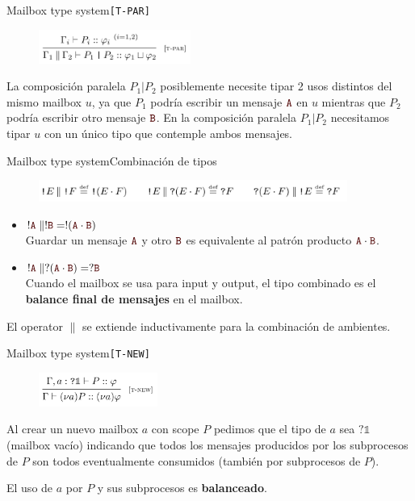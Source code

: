 \documentclass{beamer}
\newcommand{\msgtag}[1]{\texttt{\textcolor{msg-color}{#1}}}
\begin{document}
\begin{frame}{Mailbox type system}{\texttt{[T-PAR]}}
    \begin{figure}[H]
        \includegraphics[height=3em]{typing-rules-t-par}
    \end{figure}

    La composición paralela $P_1 | P_2$ posiblemente necesite tipar 2 usos distintos del mismo mailbox $u$, ya que $P_1$ podría escribir un mensaje $\msgtag{A}$ en $u$ mientras que $P_2$ podría escribir otro mensaje $\msgtag{B}$. En la composición paralela $P_1 | P_2$ necesitamos tipar $u$ con un único tipo que contemple ambos mensajes.
\end{frame}

\begin{frame}{Mailbox type system}{Combinación de tipos}
    \begin{figure}[H]
        \includegraphics[width=0.9\textwidth]{type-combinator}
    \end{figure}

    \begin{itemize}
        \item $!\msgtag{A} \parallel !\msgtag{B} = !(\msgtag{A} \cdot \msgtag{B})$
            \\ Guardar un mensaje $\msgtag{A}$ y otro $\msgtag{B}$ es equivalente al patrón producto $\msgtag{A} \cdot \msgtag{B}$.
        \item $!\msgtag{A} \parallel ?(\msgtag{A} \cdot \msgtag{B}) = ?\msgtag{B}$
            \\ Cuando el mailbox se usa para input y output, el tipo combinado es el \textbf{balance final de mensajes} en el mailbox.
    \end{itemize}

    El operator $\parallel$ se extiende inductivamente para la combinación de ambientes.
\end{frame}

\begin{frame}{Mailbox type system}{\texttt{[T-NEW]}}
    \begin{figure}[H]
        \includegraphics[height=3em]{typing-rules-t-new}
    \end{figure}

    Al crear un nuevo mailbox $a$ con scope $P$ pedimos que el tipo de $a$ sea $?\mathbb{1}$ (mailbox vacío) indicando que todos los mensajes producidos por los subprocesos de $P$ son todos eventualmente consumidos (también por subprocesos de $P$).
    \vspace{1em}

    El uso de $a$ por $P$ y sus subprocesos es \textbf{balanceado}.
\end{frame}
\end{document}
